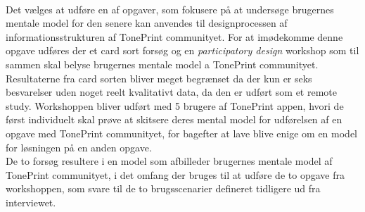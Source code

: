 \\
Det vælges at udføre en af opgaver, som fokusere på at undersøge brugernes mentale model for den senere kan anvendes til designprocessen af informationsstrukturen af TonePrint communityet. For at imødekomme denne opgave udføres der et card sort forsøg og en \textit{participatory design} workshop som til sammen skal belyse brugernes mentale model a TonePrint communityet.\\
Resultaterne fra card sorten bliver meget begrænset da der kun er seks besvarelser uden noget reelt kvalitativt data, da den er udført som et remote study. Workshoppen bliver udført med 5 brugere af TonePrint appen, hvori de først individuelt skal prøve at skitsere deres mental model for udførelsen af en opgave med TonePrint communityet, for bagefter at lave blive enige om en model for løsningen på en anden opgave. \\
De to forsøg resultere i en model som afbilleder brugernes mentale model af TonePrint communityet, i det omfang der bruges til at udføre de to opgave fra workshoppen, som svare til de to brugsscenarier defineret tidligere ud fra interviewet.
